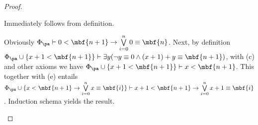 \begin{proof}
\begin{inparaenum}[(a)]
%
\item Immediately follows from definition.\medskip\\
%
\item Obviously $\Phi_\pa \vdash 0 < \mbf{n + 1} \rightarrow \bigvee\limits^n_{i = 0} 0 \equiv \mbf{n}$. Next, by definition $\Phi_\pa \cup \{ x + 1 < \mbf{n + 1} \} \vdash \exists y (\neg y \equiv 0 \land (x + 1) + y \equiv \mbf{n + 1})$, with (c) and other axioms we have $\Phi_\pa \cup \{ x + 1 < \mbf{n + 1} \} \vdash x < \mbf{n + 1}$. This together with (e) entails $\Phi_\pa \cup \{ x < \mbf{n + 1} \rightarrow \bigvee\limits^n_{i = 0} x \equiv \mbf{i} \} \vdash x + 1 < \mbf{n + 1} \rightarrow \bigvee\limits^n_{i = 0} x + 1 \equiv \mbf{i}$. Induction schema yields the result.
%
\end{inparaenum}
\end{proof}